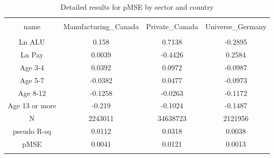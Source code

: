 
\begin{table}[!htbp] \centering 
  \caption{Detailed results for pMSE by sector and country} 
  \label{tab:pmse:details} 
\begin{tabular}{@{\extracolsep{5pt}} cccc} 
\\[-1.8ex]\hline 
\hline \\[-1.8ex] 
name & Manufacturing\_Canada & Private\_Canada & Universe\_Germany \\ 
\hline \\[-1.8ex] 
Ln ALU & 0.158 & 0.7138 & -0.2895 \\ 
Ln Pay & 0.0039 & -0.4426 & 0.2584 \\ 
Age 3-4 & 0.0392 & 0.0972 & -0.0987 \\ 
Age 5-7 & -0.0382 & 0.0477 & -0.0973 \\ 
Age 8-12 & -0.1258 & -0.0263 & -0.1172 \\ 
Age 13 or more & -0.219 & -0.1024 & -0.1487 \\ 
N & 2243011 & 34638723 & 2121956 \\ 
pseudo R-sq & 0.0112 & 0.0318 & 0.0038 \\ 
pMSE & 0.0041 & 0.0121 & 0.0013 \\ 
\hline \\[-1.8ex] 
\end{tabular} 
\end{table} 
